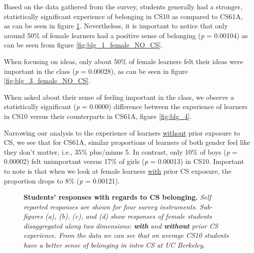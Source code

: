 \documentclass[twoside,openright,titlepage,numbers=noenddot,headinclude,%
               footinclude=true,cleardoublepage=empty,abstractoff,BCOR=5mm,%
               paper=a4,fontsize=11pt,ngerman,american]{scrreprt}
\numberwithin{theorem}{chapter}
\numberwithin{definition}{chapter}
\numberwithin{algorithm}{chapter}
\numberwithin{figure}{chapter}
\numberwithin{table}{chapter}
\numberwithin{equation}{chapter}
\begin{document}
Based on the data gathered from the survey, students generally had a stronger, statistically significant experience of belonging in CS10 as compared to CS61A, as can be seen in figure \ref{blg_Dim}. Nevertheless, it is important to notice that only around 50\% of female learners had a positive sense of belonging (\emph{p} = 0.00104) as can be seen from figure \ref{fig:blg_1_female_NO_CS}. 

When focusing on ideas, only about 50\% of female learners felt their ideas were important in the class (\emph{p} = 0.00028), as can be seen in figure \ref{fig:blg_3_female_NO_CS}. 

When asked about their sense of feeling important in the class, we observe a statistically significant (\emph{p} = 0.0000) difference between the experience of learners in CS10 versus their counterparts in CS61A, figure \ref{fig:blg_4}. 

Narrowing our analysis to the experience of learners \underline{without} prior exposure to CS, we see that for CS61A, similar proportions of learners of both gender feel like they don't matter, i.e., 35\% plus/minus 5. In contrast, only 10\% of boys (\emph{p} = 0.00002) felt unimportant versus 17\% of girls (\emph{p} = 0.00013) in CS10. Important to note is that when we look at female learners \underline{with} prior CS exposure, the proportion drops to 8\% (\emph{p} = 0.00121).

\begin{figure}[!htbp]
    \qquad
    \qquad
\caption{\textbf{Students' responses with regards to CS belonging.} \textit{Self reported responses are shown for four survey instruments. Sub-figures (a), (b), (c), and (d) show responses of female students disaggregated along two dimensions: \textbf{with} and \textbf{without} prior CS experience. From the data we can see that on average CS10 students have a better sense of belonging in intro CS at UC Berkeley.}}
\label{blg_Dim}
\end{figure}
\end{document}
